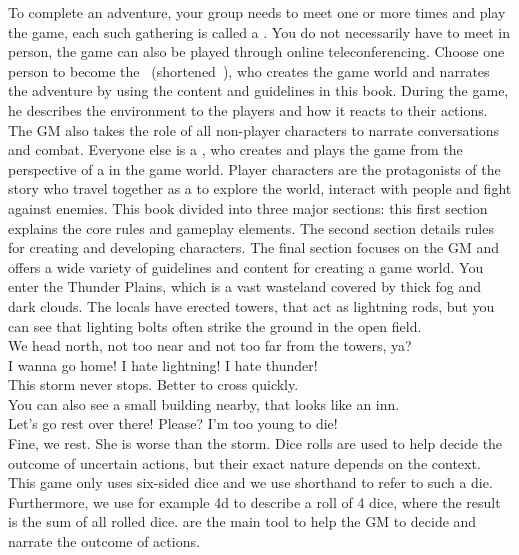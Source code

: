 To complete an adventure, your group needs to meet one or more times and play the game, each such gathering is called a .
You do not necessarily have to meet in person, the game can also be played through online teleconferencing.
%
\ofpar
%
Choose one person to become the ~(shortened~), who creates the game world and narrates the adventure by using the content and guidelines in this book.
During the game, he describes the environment to the players and how it reacts to their actions. 
The GM also takes the role of all non-player characters to narrate conversations and combat. 
Everyone else is a , who creates and plays the game from the perspective of a  in the game world.
Player characters are the protagonists of the story who travel together as a  to explore the world, interact with people and fight against enemies. 
This book divided into three major sections: this first section explains the core rules and gameplay elements.
The second section details rules for creating and developing characters.
The final section focuses on the GM and offers a wide variety of guidelines and content for creating a game world. 
%
\vfill
%
{
	\newcommand{\nl}{\vspace{0.2cm}\\}
	 You enter the Thunder Plains, which is a vast wasteland covered by thick fog and dark clouds.
	The locals have erected towers, that act as lightning rods, but you can see that lighting bolts often strike the ground in the open field.\nl
	 We head north, not too near and not too far from the towers, ya?\nl
	 I wanna go home! I hate lightning! I hate thunder!\nl
	 This storm never stops. Better to cross quickly.\nl
	 You can also see a small building nearby, that looks like an inn.\nl
	 Let’s go rest over there! Please? I'm too young to die!\nl
	 Fine, we rest. She is worse than the storm.
}
%
\vfill
%
Dice rolls are used to help decide the outcome of uncertain actions, but their exact nature depends on the context. 
This game only uses six-sided dice and we use  shorthand to refer to such a die.
Furthermore, we use for example 4d to describe a roll of 4 dice, where the result is the sum of all rolled dice.
 are the main tool to help the GM to decide and narrate the outcome of actions.
